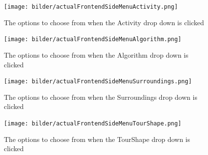 \begin{figure}[H]
	\texttt{[image: bilder/actualFrontendSideMenuActivity.png]}
	\caption{The options to choose from when the Activity drop down is clicked}
	\label{fig:actualFrontendSideMenuActivity}
\end{figure}


\begin{figure}[H]
	\texttt{[image: bilder/actualFrontendSideMenuAlgorithm.png]}
	\caption{The options to choose from when the Algorithm drop down is clicked}
	\label{fig:actualFrontendSideMenuAlgorithm}
\end{figure}


\begin{figure}[H]
	\texttt{[image: bilder/actualFrontendSideMenuSurroundings.png]}
	\caption{The options to choose from when the Surroundings drop down is clicked}
	\label{fig:actualFrontendSideMenuSurroundings}
\end{figure}


\begin{figure}[H]
	\texttt{[image: bilder/actualFrontendSideMenuTourShape.png]}
	\caption{The options to choose from when the TourShape drop down is clicked}
	\label{fig:actualFrontendSideMenuTourShape}
\end{figure}



